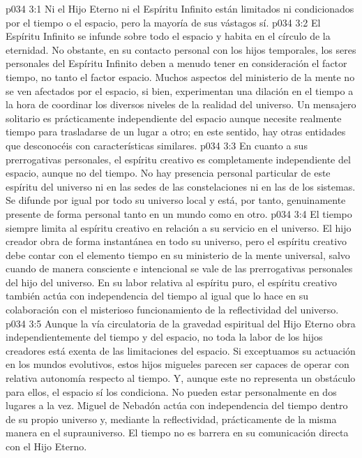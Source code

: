 \vs p034 3:1 Ni el Hijo Eterno ni el Espíritu Infinito están limitados ni condicionados por el tiempo o el espacio, pero la mayoría de sus vástagos sí.
\vs p034 3:2 El Espíritu Infinito se infunde sobre todo el espacio y habita en el círculo de la eternidad. No obstante, en su contacto personal con los hijos temporales, los seres personales del Espíritu Infinito deben a menudo tener en consideración el factor tiempo, no tanto el factor espacio. Muchos aspectos del ministerio de la mente no se ven afectados por el espacio, si bien, experimentan una dilación en el tiempo a la hora de coordinar los diversos niveles de la realidad del universo. Un mensajero solitario es prácticamente independiente del espacio aunque necesite realmente tiempo para trasladarse de un lugar a otro; en este sentido, hay otras entidades que desconocéis con características similares.
\vs p034 3:3 \pc En cuanto a sus prerrogativas personales, el espíritu creativo es completamente independiente del espacio, aunque no del tiempo. No hay presencia personal particular de este espíritu del universo ni en las sedes de las constelaciones ni en las de los sistemas. Se difunde por igual por todo su universo local y está, por tanto, genuinamente presente de forma personal tanto en un mundo como en otro.
\vs p034 3:4 El tiempo siempre limita al espíritu creativo en relación a su servicio en el universo. El hijo creador obra de forma instantánea en todo su universo, pero el espíritu creativo debe contar con el elemento tiempo en su ministerio de la mente universal, salvo cuando de manera consciente e intencional se vale de las prerrogativas personales del hijo del universo. En su labor relativa al espíritu puro, el espíritu creativo también actúa con independencia del tiempo al igual que lo hace en su colaboración con el misterioso funcionamiento de la reflectividad del universo.
\vs p034 3:5 \pc Aunque la vía circulatoria de la gravedad espiritual del Hijo Eterno obra independientemente del tiempo y del espacio, no toda la labor de los hijos creadores está exenta de las limitaciones del espacio. Si exceptuamos su actuación en los mundos evolutivos, estos hijos migueles parecen ser capaces de operar con relativa autonomía respecto al tiempo. Y, aunque este no representa un obstáculo para ellos, el espacio sí los condiciona. No pueden estar personalmente en dos lugares a la vez. Miguel de Nebadón actúa con independencia del tiempo dentro de su propio universo y, mediante la reflectividad, prácticamente de la misma manera en el suprauniverso. El tiempo no es barrera en su comunicación directa con el Hijo Eterno.
